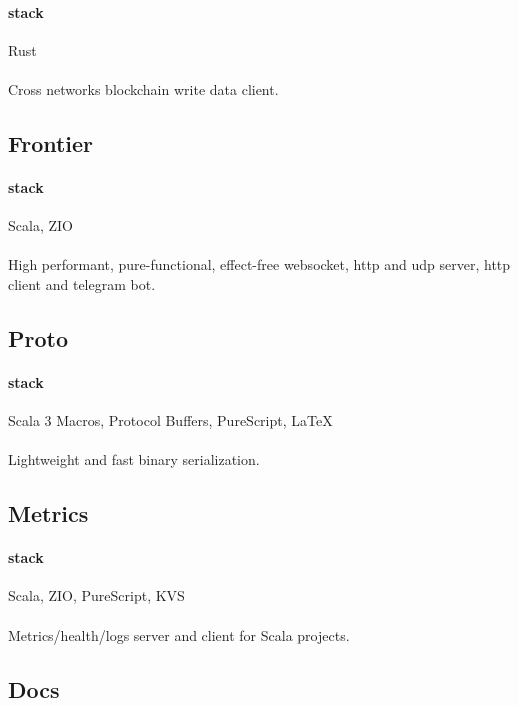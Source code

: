 \paragraph{stack} Rust
\paragraph{}
Cross networks blockchain write data client.

\subsection{Frontier}
\paragraph{stack} Scala, ZIO
\paragraph{}
High performant, pure-functional, effect-free websocket, http and udp server, http client and telegram bot.

\subsection{Proto}
\paragraph{stack}{Scala 3 Macros, Protocol Buffers, PureScript, LaTeX}
\paragraph{}
Lightweight and fast binary serialization.

\subsection{Metrics}
\paragraph{stack} Scala, ZIO, PureScript, KVS
\paragraph{}
Metrics/health/logs server and client for Scala projects.

\subsection{Docs}
